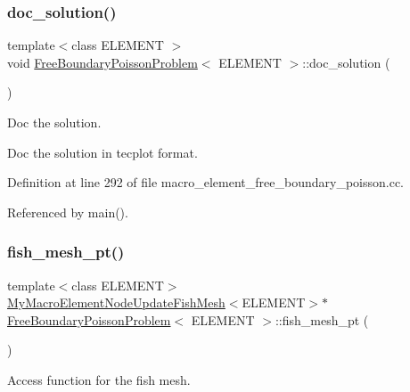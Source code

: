 \subsubsection{\texorpdfstring{doc\+\_\+solution()}{doc\_solution()}\hspace{0.1cm}{\footnotesize\ttfamily [2/2]}}
{\footnotesize\ttfamily template$<$class E\+L\+E\+M\+E\+NT $>$ \\
void \hyperlink{classFreeBoundaryPoissonProblem}{Free\+Boundary\+Poisson\+Problem}$<$ E\+L\+E\+M\+E\+NT $>$\+::doc\+\_\+solution (\begin{DoxyParamCaption}{ }\end{DoxyParamCaption})}



Doc the solution. 

Doc the solution in tecplot format. 

Definition at line 292 of file macro\+\_\+element\+\_\+free\+\_\+boundary\+\_\+poisson.\+cc.



Referenced by main().

\mbox{\label{classFreeBoundaryPoissonProblem_a2e5bc4d52a7d8feefc2aafae0fd29bab}} 
\subsubsection{\texorpdfstring{fish\+\_\+mesh\+\_\+pt()}{fish\_mesh\_pt()}\hspace{0.1cm}{\footnotesize\ttfamily [1/2]}}
{\footnotesize\ttfamily template$<$class E\+L\+E\+M\+E\+NT$>$ \\
\hyperlink{classMyMacroElementNodeUpdateFishMesh}{My\+Macro\+Element\+Node\+Update\+Fish\+Mesh}$<$E\+L\+E\+M\+E\+NT$>$$\ast$ \hyperlink{classFreeBoundaryPoissonProblem}{Free\+Boundary\+Poisson\+Problem}$<$ E\+L\+E\+M\+E\+NT $>$\+::fish\+\_\+mesh\+\_\+pt (\begin{DoxyParamCaption}{ }\end{DoxyParamCaption})\hspace{0.3cm}{\ttfamily [inline]}}



Access function for the fish mesh. 



